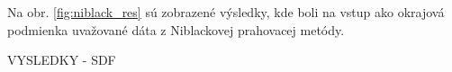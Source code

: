 \documentclass[a4paper,11pt,oneside]{article}%
\begin{document}
Na obr. \ref{fig:niblack_res} sú zobrazené výsledky, kde boli na vstup ako okrajová podmienka uvažované dáta z Niblackovej prahovacej metódy.

VYSLEDKY - SDF

\begin{figure}[H]  
    \hspace{5px}

\end{figure}
\end{document}
